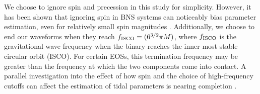 \documentclass[twocolumn,prd,amssymb,aps,nofootinbib,showpacs,epsf]{revtex4}
\newcommand{\red}{\textcolor{red}}
\begin{document}
We choose to ignore spin and precession in this study for simplicity.  However, it has been shown that ignoring spin in BNS systems can noticeably bias parameter estimation, even for relatively small spin magnitudes \cite{Favata2014}.  Additionally, we choose to end our waveforms when they reach $f_{\rm ISCO}=(6^{3/2}\pi M)$, where $f_{\rm ISCO}$ is the gravitational-wave frequency when the binary reaches the inner-most stable circular orbit (ISCO).  For certain EOSs, this termination frequency may be greater than the frequency at which the two components come into contact.  A parallel investigation into the effect of how spin and the choice of high-frequency cutoffs can affect the estimation of tidal parameters is nearing completion \cite{Nikhef_paper_2}.

\end{document}
